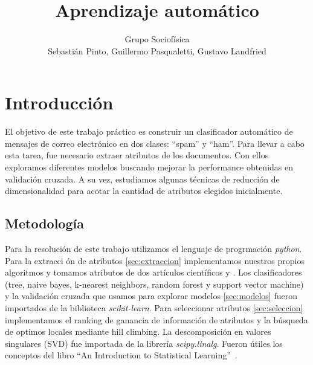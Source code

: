 \documentclass[a4paper,10pt]{article}
\title{Aprendizaje autom\'atico}
\author{Grupo Sociof\'isica \\
Sebasti\'an Pinto, Guillermo Pasqualetti, Gustavo Landfried}
\begin{document}
\maketitle

\section{Introducci\'on}


El objetivo de este trabajo práctico es construir un clasificador automático de mensajes de correo electrónico en dos clases: ``spam'' y ``ham''. Para llevar a cabo esta tarea, fue necesario extraer atributos de los documentos. Con ellos exploramos diferentes modelos buscando mejorar la performance obtenidas en validaci\'on cruzada. A su vez, estudiamos algunas técnicas de reducción de dimensionalidad para acotar la cantidad de atributos elegidos inicialmente.

\subsection{Metodología}

\par Para la resolución de este trabajo utilizamos el lenguaje de progrmaci\'on \emph{python}. Para la extracci \'on de atributos \ref{sec:extraccion} implementamos nuestros propios algoritmos y tomamos atributos de dos art\'iculos cient\'ificos \cite{Gunal} y \cite{Vaughan}. Los clasificadores (tree, naive bayes, k-nearest neighbors, random forest y support vector machine) y la validaci\'on cruzada que usamos para explorar modelos \ref{sec:modelos} fueron importados de la biblioteca \emph{scikit-learn}\cite{sklearn}. Para seleccionar atributos \ref{sec:seleccion} implementamos el ranking de ganancia de informaci\'on de atributos y la b\'usqueda de optimos locales mediante hill climbing. La descomposición en valores singulares (SVD) fue importada de la librería \emph{scipy.linalg}\cite{scipy}. Fueron \'utiles los conceptos del libro ``An Introduction to Statistical Learning''~\cite{james_hastie_tibshirani}.
\end{document}
